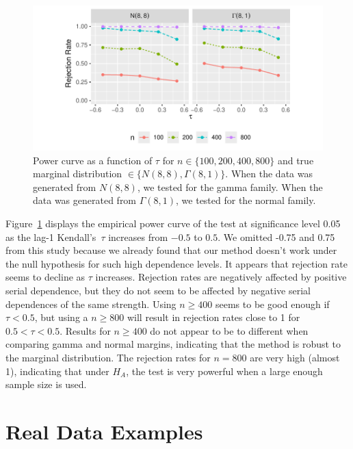 \documentclass[APA,Times1COL]{WileyNJDv5} %
\begin{document}
\begin{figure}[tbp]
  \centering
  \includegraphics[scale=1]{figures/rr}
  \caption{Power curve as a function of $\tau$ for
    $n \in \{100, 200, 400, 800\}$ and true marginal distribution 
    $\in \{N(8,8), \Gamma(8,1)\}$. When the data was generated from $N(8,8)$,
    we tested for the gamma family. When the data was generated from 
    $\Gamma(8,1)$, we tested for the normal family. 
  }
  \label{fig:rr}
\end{figure}


Figure~\ref{fig:rr} displays the empirical power curve of the test at
significance level 0.05 as the lag-1 Kendall's~$\tau$ increases from
$-0.5$ to $0.5$. We omitted -0.75 and 0.75 from this study because we already 
found that our method doesn't work under the null hypothesis for such high
dependence levels. It appears that rejection rate seems to decline as $\tau$
increases. Rejection rates are negatively affected by positive serial 
dependence, but they do not seem to be affected by negative serial dependences
of the same strength.
Using $n \geq 400$ seems to be good enough
if $\tau < 0.5$, but using a $n \geq 800$ will result in 
rejection rates close to 1 for $0.5 < \tau < 0.5$.
Results for $n \geq 400$
do not appear to be to different when comparing gamma and normal 
margins, indicating that the method is robust to the marginal distribution.
The rejection rates for $n = 800$ are very 
high (almost 1), indicating that under $H_A$, the test is very powerful 
when a large enough sample size is used.


\section{Real Data Examples}
\label{sec:real}
\end{document}
